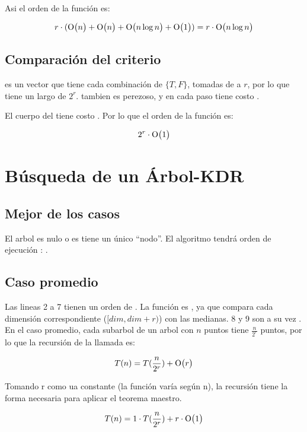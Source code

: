 Asi el orden de la función  es:

\[ r \cdot (\mathrm{O}\bigl(n\bigr)+\mathrm{O}\bigl(n\bigr)+\mathrm{O}\bigl(n \log{n}\bigr) + \mathrm{O}\bigl(1\bigr)) \\
   = r \cdot \mathrm{O}\bigl(n \log{n}\bigr)  \]

\subsection{Comparación del criterio}


 es un vector que tiene cada combinación de \(\{ T, F \}\),
tomadas de a \(r\), por lo que tiene un largo de \(2^r\). 
tambien es perezoso, y en cada paso tiene costo .

El cuerpo del  tiene costo . Por lo que el orden de la función es:

\[ 2^r \cdot \mathrm{O}\bigl(1\bigr) \]







\section{Búsqueda de un Árbol-KDR}


\subsection{Mejor de los casos}
El arbol es nulo o es tiene un único ``nodo''.
El algoritmo tendrá orden de ejecución : .

\subsection{Caso promedio}
Las lineas 2 a 7 tienen un orden de . La función 
es , ya que compara cada dimensión correspondiente (\([dim, dim+r)\))
con las medianas. 8 y 9 son a su vez .
En el caso promedio, cada subarbol de un arbol con \(n\) puntos tiene
\(\frac{n}{2^r}\) puntos, por lo que la recursión de la llamada es:

\[ T(n) = T(\frac{n}{2^r}) + \mathrm{O}\bigl(r\bigr) \]

Tomando r como ua constante (la función varía según n), la recursión
tiene la forma necesaria para aplicar el teorema maestro.

\[ T(n) = 1 \cdot T(\frac{n}{2^r}) + r \cdot \mathrm{O}\bigl(1\bigr) \]


